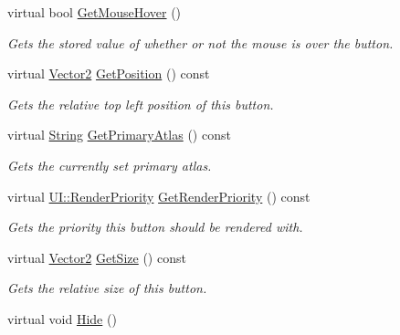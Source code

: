 \begin{DoxyCompactItemize}
virtual bool \hyperlink{classMezzanine_1_1UI_1_1Button_a18e33bd98a247c8fce95a504bd52e767}{GetMouseHover} ()
\begin{DoxyCompactList}\small\item\em Gets the stored value of whether or not the mouse is over the button. \item\end{DoxyCompactList}\item 
virtual \hyperlink{classMezzanine_1_1Vector2}{Vector2} \hyperlink{classMezzanine_1_1UI_1_1Button_ab49077b4d05873f0a6d397720790ae49}{GetPosition} () const 
\begin{DoxyCompactList}\small\item\em Gets the relative top left position of this button. \item\end{DoxyCompactList}\item 
virtual \hyperlink{namespaceMezzanine_acf9fcc130e6ebf08e3d8491aebcf1c86}{String} \hyperlink{classMezzanine_1_1UI_1_1Button_ab4dabfe9ce18dd255d2b8724f610058d}{GetPrimaryAtlas} () const 
\begin{DoxyCompactList}\small\item\em Gets the currently set primary atlas. \item\end{DoxyCompactList}\item 
virtual \hyperlink{namespaceMezzanine_1_1UI_ac4c753eb6b5d66350a243acc9ce54130}{UI::RenderPriority} \hyperlink{classMezzanine_1_1UI_1_1Button_ad2e567a12e059c612e474e96fd9cd5da}{GetRenderPriority} () const 
\begin{DoxyCompactList}\small\item\em Gets the priority this button should be rendered with. \item\end{DoxyCompactList}\item 
virtual \hyperlink{classMezzanine_1_1Vector2}{Vector2} \hyperlink{classMezzanine_1_1UI_1_1Button_a6836b68da28da089584dd02547674286}{GetSize} () const 
\begin{DoxyCompactList}\small\item\em Gets the relative size of this button. \item\end{DoxyCompactList}\item 
\hypertarget{classMezzanine_1_1UI_1_1Button_ae4d892127653d709b6cff9207f473c9e}{
virtual void \hyperlink{classMezzanine_1_1UI_1_1Button_ae4d892127653d709b6cff9207f473c9e}{Hide} ()}
\label{classMezzanine_1_1UI_1_1Button_ae4d892127653d709b6cff9207f473c9e}


\end{DoxyCompactItemize}
